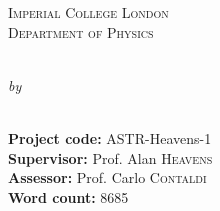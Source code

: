 
\begin{titlepage}

\vspace*{2cm}
\makeatletter
\center

\textsc{\Large Imperial College London}\\[0.2cm] 
\textsc{\large Department of Physics}\\[0.5cm] 

\vspace*{2cm}

\begin{Huge}
  \@title
\end{Huge}\\[0.1cm]
%
%
\emph{by}\\
\@author\\
%
\vspace*{3cm}

\textbf{Project code:} ASTR-Heavens-1\\
\textbf{Supervisor:} Prof. Alan \textsc{Heavens} \\ %
\textbf{Assessor:} Prof. Carlo \textsc{Contaldi} \\
\textbf{Word count:} 8685


\makeatother


\end{titlepage}

\newpage
\null
\thispagestyle{empty}
\newpage